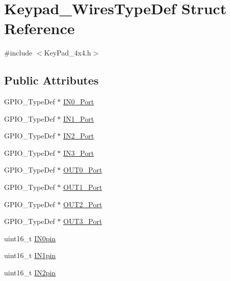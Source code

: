\hypertarget{struct_keypad___wires_type_def}{}\section{Keypad\+\_\+\+Wires\+Type\+Def Struct Reference}
\label{struct_keypad___wires_type_def}


{\ttfamily \#include $<$Key\+Pad\+\_\+4x4.\+h$>$}

\subsection*{Public Attributes}
\begin{DoxyCompactItemize}
\item 
G\+P\+I\+O\+\_\+\+Type\+Def $\ast$ \hyperlink{group___key_pad___functions_ga47955289b19390cde1cbc4c77f042369}{I\+N0\+\_\+\+Port}
\item 
G\+P\+I\+O\+\_\+\+Type\+Def $\ast$ \hyperlink{group___key_pad___functions_gacaa68d159d45a332a4932cd1b169d2ea}{I\+N1\+\_\+\+Port}
\item 
G\+P\+I\+O\+\_\+\+Type\+Def $\ast$ \hyperlink{group___key_pad___functions_ga29bcacbed0e3a0434a118a920050c682}{I\+N2\+\_\+\+Port}
\item 
G\+P\+I\+O\+\_\+\+Type\+Def $\ast$ \hyperlink{group___key_pad___functions_ga1c91503556cf87dd73d1372c64271ebc}{I\+N3\+\_\+\+Port}
\item 
G\+P\+I\+O\+\_\+\+Type\+Def $\ast$ \hyperlink{group___key_pad___functions_ga10de1d8c79b463b7fa695d5df589c427}{O\+U\+T0\+\_\+\+Port}
\item 
G\+P\+I\+O\+\_\+\+Type\+Def $\ast$ \hyperlink{group___key_pad___functions_ga5e0930dd209c2c8f460b318a19e1396f}{O\+U\+T1\+\_\+\+Port}
\item 
G\+P\+I\+O\+\_\+\+Type\+Def $\ast$ \hyperlink{group___key_pad___functions_gaa0c12d07fe7f540e10d5d31b268e9946}{O\+U\+T2\+\_\+\+Port}
\item 
G\+P\+I\+O\+\_\+\+Type\+Def $\ast$ \hyperlink{group___key_pad___functions_ga5032c6a39064da097f66706a20bed691}{O\+U\+T3\+\_\+\+Port}
\item 
uint16\+\_\+t \hyperlink{group___key_pad___functions_ga1982da4b510d015cde3d54a120d32461}{I\+N0pin}
\item 
uint16\+\_\+t \hyperlink{group___key_pad___functions_gad3d88b65475a470373eff3b7960853b8}{I\+N1pin}
\item 
uint16\+\_\+t \hyperlink{group___key_pad___functions_ga5091f76517c45ce696eac83b97dc9e44}{I\+N2pin}

\end{DoxyCompactItemize}
